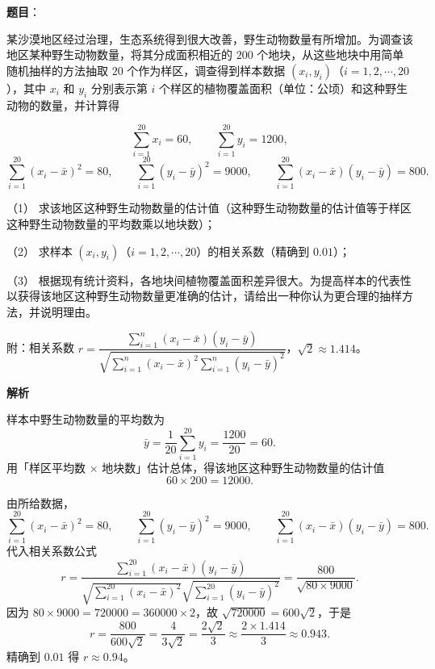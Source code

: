 \begin{answer}

\textbf{题目}：

某沙漠地区经过治理，生态系统得到很大改善，野生动物数量有所增加。为调查该地区某种野生动物数量，将其分成面积相近的 $200$ 个地块，从这些地块中用简单随机抽样的方法抽取 $20$ 个作为样区，调查得到样本数据 $(x_i,y_i)$（$i=1,2,\cdots,20$），其中 $x_i$ 和 $y_i$ 分别表示第 $i$ 个样区的植物覆盖面积（单位：公顷）和这种野生动物的数量，并计算得

\nopagebreak[4]
\[\sum_{i=1}^{20}x_i=60,\qquad \sum_{i=1}^{20}y_i=1200,\]
\nopagebreak[4]
\[\sum_{i=1}^{20}(x_i-\bar x)^2=80,\qquad \sum_{i=1}^{20}(y_i-\bar y)^2=9000,\qquad \sum_{i=1}^{20}(x_i-\bar x)(y_i-\bar y)=800.\]

（1） 求该地区这种野生动物数量的估计值（这种野生动物数量的估计值等于样区这种野生动物数量的平均数乘以地块数）；

（2） 求样本 $(x_i,y_i)$（$i=1,2,\cdots,20$）的相关系数（精确到 $0.01$）；

（3） 根据现有统计资料，各地块间植物覆盖面积差异很大。为提高样本的代表性以获得该地区这种野生动物数量更准确的估计，请给出一种你认为更合理的抽样方法，并说明理由。

附：相关系数 $r=\dfrac{\sum\limits_{i=1}^n(x_i-\bar x)(y_i-\bar y)}{\sqrt{\sum\limits_{i=1}^n(x_i-\bar x)^2\sum\limits_{i=1}^n(y_i-\bar y)^2}}$，$\sqrt2\approx1.414$。

\textbf{解析}


样本中野生动物数量的平均数为
\nopagebreak[4]
\[\bar y=\frac1{20}\sum_{i=1}^{20}y_i=\frac{1200}{20}=60 .\]
用「样区平均数 $\times$ 地块数」估计总体，得该地区这种野生动物数量的估计值
\nopagebreak[4]
\[60\times200=12000 .\]


由所给数据，
\nopagebreak[4]
\[\sum_{i=1}^{20}(x_i-\bar x)^2=80,\qquad \sum_{i=1}^{20}(y_i-\bar y)^2=9000,\qquad \sum_{i=1}^{20}(x_i-\bar x)(y_i-\bar y)=800 .\]
代入相关系数公式
\nopagebreak[4]
\[r=\frac{\sum\limits_{i=1}^{20}(x_i-\bar x)(y_i-\bar y)}
{\sqrt{\sum\limits_{i=1}^{20}(x_i-\bar x)^2}\sqrt{\sum\limits_{i=1}^{20}(y_i-\bar y)^2}}
=\frac{800}{\sqrt{80\times9000}} .\]
因为 $80\times9000=720000=360000\times2$，故 $\sqrt{720000}=600\sqrt2$，于是
\nopagebreak[4]
\[r=\frac{800}{600\sqrt2}=\frac{4}{3\sqrt2}=\frac{2\sqrt2}3\approx\frac{2\times1.414}3\approx0.943 .\]
精确到 $0.01$ 得 $r\approx0.94$。


\end{answer}
